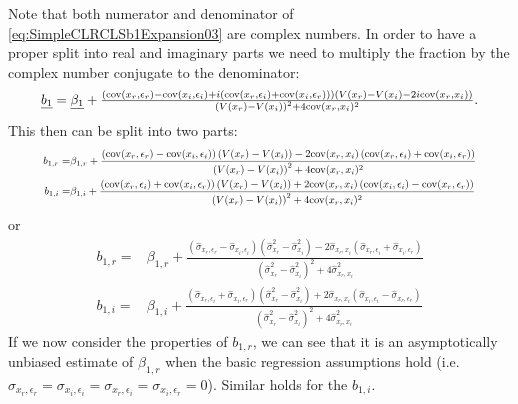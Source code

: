 \documentclass[
]{book}
\begin{document}
Note that both numerator and denominator of \eqref{eq:SimpleCLRCLSb1Expansion03} are complex numbers. In order to have a proper split into real and imaginary parts we need to multiply the fraction by the complex number conjugate to the denominator:
\begin{equation}
\resizebox{0.9\textwidth}{!}{$
        \underline{b_1} = \underline{\beta_1} + \frac{\left(\mathrm{cov}(x_r, \epsilon_r) - \mathrm{cov}(x_i, \epsilon_i) + i (\mathrm{cov}(x_r, \epsilon_i) + \mathrm{cov}(x_i, \epsilon_r))\right)\left(V(x_r) - V(x_i) - 2i \mathrm{cov}(x_r, x_i)\right)}{\left(V(x_r) - V(x_i)\right)^2 + 4 \mathrm{cov}(x_r, x_i)^2} $}.
    \label{eq:SimpleCLRCLSb1Expansion04}
\end{equation}
This then can be split into two parts:
\begin{equation}
\resizebox{0.9\textwidth}{!}{$
    \begin{aligned}
        b_{1,r} = & \beta_{1,r} + \frac{\left(\mathrm{cov}(x_r, \epsilon_r) - \mathrm{cov}(x_i, \epsilon_i)\right) \left(V(x_r) - V(x_i)\right) - 2 \mathrm{cov}(x_r, x_i) \left(\mathrm{cov}(x_r, \epsilon_i) + \mathrm{cov}(x_i, \epsilon_r)\right)}{\left(V(x_r) - V(x_i)\right)^2 + 4 \mathrm{cov}(x_r, x_i)^2} \\
        b_{1,i} = & \beta_{1,i} + \frac{\left( \mathrm{cov}(x_r, \epsilon_i) + \mathrm{cov}(x_i, \epsilon_r)\right)\left(V(x_r) - V(x_i) \right) + 2 \mathrm{cov}(x_r, x_i) \left(\mathrm{cov}(x_i, \epsilon_i) - \mathrm{cov}(x_r, \epsilon_r)\right)}{\left(V(x_r) - V(x_i)\right)^2 + 4 \mathrm{cov}(x_r, x_i)^2} 
    \end{aligned}$}
    \label{eq:SimpleCLRCLSb1Expansion05}
\end{equation}
or
\begin{equation}
    \begin{aligned}
        b_{1,r} = & \beta_{1,r} + \frac{\left(\hat{\sigma}_{x_r, \epsilon_r} - \hat{\sigma}_{x_i, \epsilon_i}\right) \left(\hat{\sigma}_{x_r}^2 - \hat{\sigma}_{x_i}^2 \right) - 2 \hat{\sigma}_{x_r, x_i} \left(\hat{\sigma}_{x_r, \epsilon_i} + \hat{\sigma}_{x_i, \epsilon_r}\right)}{\left(\hat{\sigma}_{x_r}^2 - \hat{\sigma}_{x_i}^2\right)^2 + 4 \hat{\sigma}_{x_r, x_i}^2} \\
        b_{1,i} = & \beta_{1,i} + \frac{\left( \hat{\sigma}_{x_r, \epsilon_i} + \hat{\sigma}_{x_i, \epsilon_r}\right)\left(\hat{\sigma}_{x_r}^2 - \hat{\sigma}_{x_i}^2 \right) + 2 \hat{\sigma}_{x_r, x_i} \left(\hat{\sigma}_{x_i, \epsilon_i} - \hat{\sigma}_{x_r, \epsilon_r}\right)}{\left(\hat{\sigma}_{x_r}^2 - \hat{\sigma}_{x_i}^2\right)^2 + 4 \hat{\sigma}_{x_r, x_i}^2}
    \end{aligned}
    \label{eq:SimpleCLRCLSb1Expansion06}
\end{equation}
If we now consider the properties of \(b_{1,r}\), we can see that it is an asymptotically unbiased estimate of \(\beta_{1,r}\) when the basic regression assumptions hold (i.e.~\({\sigma}_{x_r, \epsilon_r} = {\sigma}_{x_i, \epsilon_i} = {\sigma}_{x_r, \epsilon_i} = {\sigma}_{x_i, \epsilon_r}=0\)). Similar holds for the \(b_{1,i}\).
\end{document}
